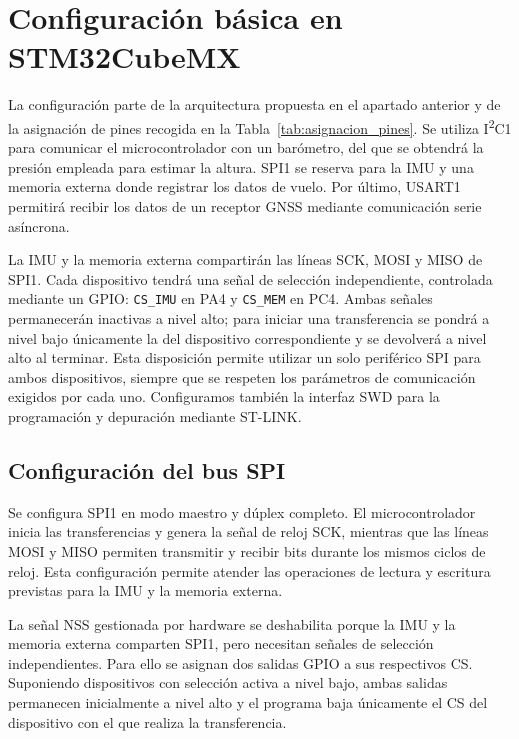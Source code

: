\documentclass[11pt,a4paper]{article}
\begin{document}
\newpage
\section{Configuración básica en STM32CubeMX}

La configuración parte de la arquitectura propuesta en el
apartado anterior y de la asignación de pines recogida en la
Tabla~\ref{tab:asignacion_pines}. Se utiliza I\textsuperscript{2}C1
para comunicar el microcontrolador con un barómetro, del que se
obtendrá la presión empleada para estimar la altura. SPI1 se
reserva para la IMU y una memoria externa donde registrar los
datos de vuelo. Por último, USART1 permitirá recibir los datos
de un receptor GNSS mediante comunicación serie asíncrona.

La IMU y la memoria externa compartirán las líneas SCK, MOSI y
MISO de SPI1. Cada dispositivo tendrá una señal de selección
independiente, controlada mediante un GPIO\@: \texttt{CS\_IMU}
en PA4 y \texttt{CS\_MEM} en PC4. Ambas señales permanecerán
inactivas a nivel alto; para iniciar una transferencia se pondrá
a nivel bajo únicamente la del dispositivo correspondiente y
se devolverá a nivel alto al terminar. Esta disposición permite
utilizar un solo periférico SPI para ambos dispositivos, siempre
que se respeten los parámetros de comunicación exigidos por
cada uno. Configuramos también la interfaz SWD para la programación y
depuración mediante ST-LINK\@.



\subsection{Configuración del bus SPI}

Se configura SPI1 en modo maestro y dúplex completo. El
microcontrolador inicia las transferencias y genera la señal de reloj
SCK, mientras que las líneas MOSI y MISO permiten transmitir y recibir
bits durante los mismos ciclos de reloj. Esta configuración permite
atender las operaciones de lectura y escritura previstas para la IMU
y la memoria externa.

La señal NSS gestionada por hardware se deshabilita porque la IMU y
la memoria externa comparten SPI1, pero necesitan señales de selección
independientes. Para ello se asignan dos salidas GPIO a sus respectivos
CS\@. Suponiendo dispositivos con selección activa a nivel bajo, ambas
salidas permanecen inicialmente a nivel alto y el programa baja
únicamente el CS del dispositivo con el que realiza la transferencia.
\end{document}
